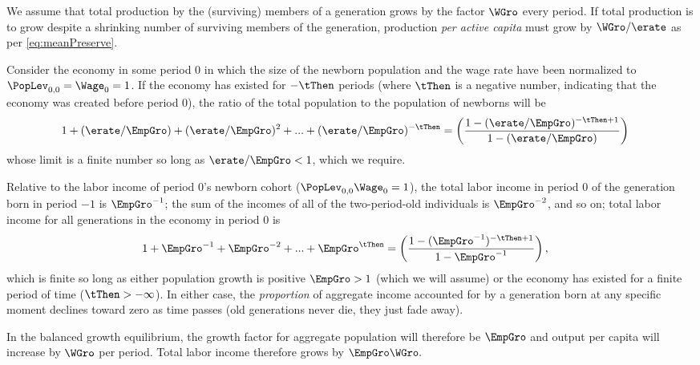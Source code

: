 \documentclass{handout}
\begin{document}
We assume that total production by the (surviving) members of a generation grows by
the factor $\WGro$ every period.  If total production is to grow
despite a shrinking number of surviving members of the generation, 
production {\it per active capita} must grow by $\WGro/\erate$ as per \eqref{eq:meanPreserve}.

Consider the economy in some period 0 in which the size of the newborn population
and the wage rate have been normalized to $\PopLev_{0,0} = \Wage_{0} = 1$.  If the economy
has existed for $-\tThen$ periods (where $\tThen$ is a negative number, indicating that the economy was created before period 0), the ratio of the total population to the population
of newborns will be 
\begin{equation}\begin{gathered}\begin{aligned}
  1 + (\erate/\EmpGro)+ (\erate/\EmpGro)^{2}+ ... +(\erate/\EmpGro)^{-\tThen} & =  \left(\frac{1-(\erate/\EmpGro)^{-\tThen+1}}{1-(\erate/\EmpGro)}\right)
\end{aligned}\end{gathered}\end{equation}
whose limit is a finite number so long as $\erate/\EmpGro < 1$, which we require.

Relative to the labor income of period 0's newborn cohort ($\PopLev_{0,0} \Wage_{0} = 1$),
the total labor income in period 0 of the generation born in period $-1$ is $\EmpGro^{-1}$; the sum of the incomes of all of the two-period-old individuals is $\EmpGro^{-2}$, and so on; total labor income for all generations in the economy in period 0 is
\begin{equation}\begin{gathered}\begin{aligned}
  1 + \EmpGro^{-1}+ \EmpGro^{-2}+ ...+\EmpGro^{\tThen} & =  \left(\frac{1-(\EmpGro^{-1})^{-\tThen+1}}{1-\EmpGro^{-1}}\right) \label{eq:LabIncTot}
,
\end{aligned}\end{gathered}\end{equation}
which is finite so long as either population growth is positive $\EmpGro>1$ (which 
we will assume) or 
the economy has existed for a finite period of time ($\tThen > -\infty$).  
In either case, the {\it proportion} of aggregate income accounted for by a generation
born at any specific moment declines toward zero as time passes (old generations never die,
they just fade away).

In the balanced growth equilibrium, the growth factor for aggregate population
will therefore be $\EmpGro$ and output per capita will increase by $\WGro$ per period.  Total
labor income therefore grows by $\EmpGro \WGro.$
\end{document}
